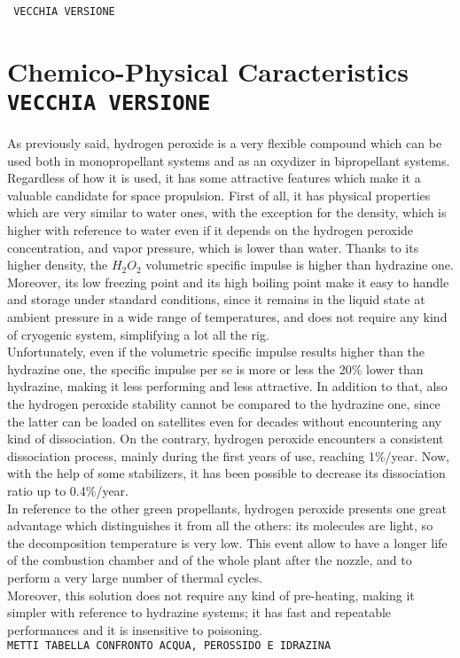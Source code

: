 \documentclass[a4paper]{report}
\begin{document}
\pagebreak



\texttt{\color{green} VECCHIA VERSIONE}




\section{Chemico-Physical Caracteristics \texttt{\color{red}VECCHIA VERSIONE}}

As previously said, hydrogen peroxide is a very flexible compound which can be used both in monopropellant systems and as an oxydizer in bipropellant systems. Regardless of how it is used, it has some attractive features which make it a valuable candidate for space propulsion. First of all, it has physical properties which are very similar to water ones, with the exception for the density, which is higher with reference to water even if it depends on the hydrogen peroxide concentration, and vapor pressure, which is lower than water. Thanks to its higher density, the $H_2O_2$ volumetric specific impulse is higher than hydrazine one. Moreover, its low freezing point and its high boiling point make it easy to handle and storage under standard conditions, since it remains in the liquid state at ambient pressure in a wide range of temperatures, and does not require any kind of cryogenic system, simplifying a lot all the rig. \\  %
Unfortunately, even if the volumetric specific impulse results higher than the hydrazine one, the specific impulse per se is more or less the 20\% lower than hydrazine, making it less performing and less attractive. In addition to that, also the hydrogen peroxide stability cannot be compared to the hydrazine one, since the latter can be loaded on satellites even for decades without encountering any kind of dissociation. On the contrary, hydrogen peroxide encounters a consistent dissociation process, mainly during the first years of use, reaching 1\%/year. Now, with the help of some stabilizers, it has been possible to decrease its dissociation ratio up to 0.4\%/year.\\ 
In reference to the other green propellants, hydrogen peroxide presents one great advantage which distinguishes it from all the others: its molecules are light, so the decomposition temperature is very low. This event allow to have a longer life of the combustion chamber and of the whole plant after the nozzle, and to perform a very large number of thermal cycles. \\
Moreover, this solution does not require any kind of pre-heating, making it simpler with reference to hydrazine systems; it has fast and repeatable performances and it is insensitive to poisoning. \\ 

\texttt{\color{red}METTI TABELLA CONFRONTO ACQUA, PEROSSIDO E IDRAZINA}
\end{document}
